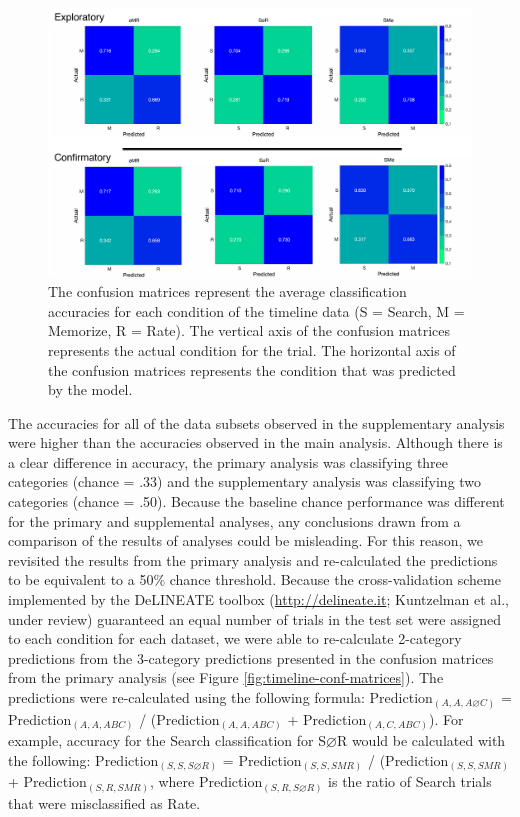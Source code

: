 \documentclass[
  english,
  man, donotrepeattitle,floatsintext]{apa6}
\begin{document}
\begin{figure}
\centering
\includegraphics{figures/supp_analysis/confusion_matrices/supp_conf_matrices.pdf}
\caption{\label{fig:supp-conf-matrices}The confusion matrices represent the average classification accuracies for each condition of the timeline data (S = Search, M = Memorize, R = Rate). The vertical axis of the confusion matrices represents the actual condition for the trial. The horizontal axis of the confusion matrices represents the condition that was predicted by the model.}
\end{figure}

The accuracies for all of the data subsets observed in the supplementary analysis were higher than the accuracies observed in the main analysis. Although there is a clear difference in accuracy, the primary analysis was classifying three categories (chance = .33) and the supplementary analysis was classifying two categories (chance = .50). Because the baseline chance performance was different for the primary and supplemental analyses, any conclusions drawn from a comparison of the results of analyses could be misleading. For this reason, we revisited the results from the primary analysis and re-calculated the predictions to be equivalent to a 50\% chance threshold. Because the cross-validation scheme implemented by the DeLINEATE toolbox (\url{http://delineate.it}; Kuntzelman et al., under review) guaranteed an equal number of trials in the test set were assigned to each condition for each dataset, we were able to re-calculate 2-category predictions from the 3-category predictions presented in the confusion matrices from the primary analysis (see Figure \ref{fig:timeline-conf-matrices}). The predictions were re-calculated using the following formula: Prediction\(_{(A, A, A\varnothing C)}\) = Prediction\(_{(A, A, ABC)}\) / (Prediction\(_{(A, A, ABC)}\) + Prediction\(_{(A, C, ABC)}\)). For example, accuracy for the Search classification for S\(\varnothing\)R would be calculated with the following: Prediction\(_{(S, S, S\varnothing R)}\) = Prediction\(_{(S, S, SMR)}\) / (Prediction\(_{(S, S, SMR)}\) + Prediction\(_{(S, R, SMR)}\), where Prediction\(_{(S, R, S\varnothing R)}\) is the ratio of Search trials that were misclassified as Rate.
\end{document}
